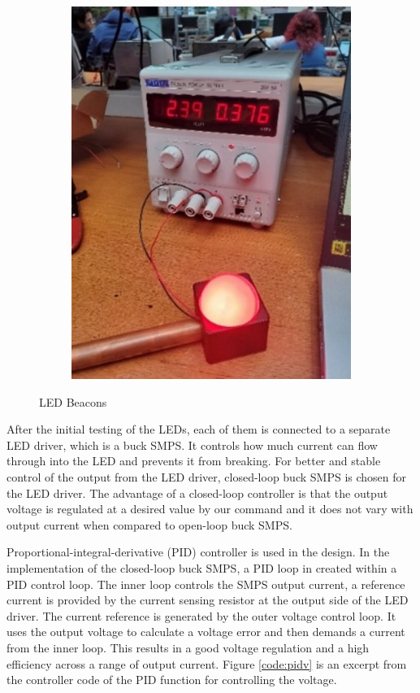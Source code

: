 \begin{figure}
\begin{subfigure}[b]{.3\linewidth}
        \includegraphics[width=\linewidth]{images/led-red.jpg}
    \end{subfigure}
    \caption{LED Beacons}
\end{figure}

After the initial testing of the LEDs, each of them is connected to a separate LED driver, which is a buck SMPS. It controls how much current can flow through into the LED and prevents it from breaking. For better and stable control of the output from the LED driver, closed-loop buck SMPS is chosen for the LED driver. The advantage of a closed-loop controller is that the output voltage is regulated at a desired value by our command and it does not vary with output current when compared to open-loop buck SMPS.

Proportional-integral-derivative (PID) controller is used in the design. In the implementation of the closed-loop buck SMPS, a PID loop in created within a PID control loop. The inner loop controls the SMPS output current, a reference current is provided by the current sensing resistor at the output side of the LED driver. The current reference is generated by the outer voltage control loop. It uses the output voltage to calculate a voltage error and then demands a current from the inner loop. This results in a good voltage regulation and a high efficiency across a range of output current. Figure \ref{code:pidv} is an excerpt from the controller code of the PID function for controlling the voltage.

